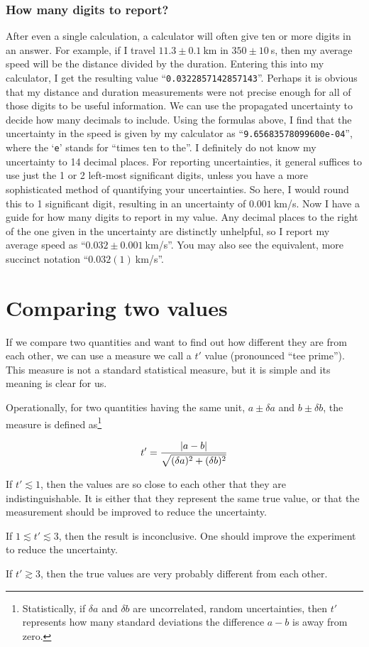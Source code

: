 \subsubsection{How many digits to report?}

After even a single calculation, a calculator will often give ten or more digits in an answer.
For example, if I travel $11.3 \pm 0.1\:$km in $350 \pm 10\:$s, then my average speed will be the distance divided by the duration. Entering this into my calculator, I get the resulting value ``\texttt{0.0322857142857143}''.
Perhaps it is obvious that my distance and duration measurements were not precise enough for all of those digits to be useful information.
We can use the propagated uncertainty to decide how many decimals to include.
Using the formulas above, I find that the uncertainty in the speed is given by my calculator as ``\texttt{9.65683578099600e-04}'', where the `\texttt{e}' stands for ``times ten to the''.
I definitely do not know my uncertainty to 14 decimal places.
For reporting uncertainties, it general suffices to use just the 1 or 2 left-most significant digits, unless you have a more sophisticated method of quantifying your uncertainties.
So here, I would round this to 1 significant digit, resulting in an uncertainty of $0.001\:$km/s.
Now I have a guide for how many digits to report in my value.
Any decimal places to the right of the one given in the uncertainty are distinctly unhelpful, so I report my average speed as ``$0.032 \pm 0.001\:$km/s''.
You may also see the equivalent, more succinct notation ``$0.032(1)\:$km/s''.

\section{Comparing two values}\label{unc:sec:comparing}

If we compare two quantities and want to find out how different they are from each other, we can use a measure we call a $t'$ value (pronounced ``tee prime''). This measure is not a standard statistical measure, but it is simple and its meaning is clear for us.

Operationally, for two quantities having the same unit, $a \pm \delta a$ and $b \pm \delta b$, the measure is defined as\footnote{Statistically, if $\delta a$ and $\delta b$ are uncorrelated, random uncertainties, then $t'$ represents how many standard deviations the difference $a - b$ is away from zero.}

\begin{equation}
t' = \frac{\left\lvert a-b\right\rvert}{\sqrt{(\delta a)^2 + (\delta b)^2}}
\end{equation}

If $t' \lesssim 1$, then the values are so close to each other that they are indistinguishable. It is either that they represent the same true value, or that the measurement should be improved to reduce the uncertainty.

If $1 \lesssim t' \lesssim 3$, then the result is inconclusive. One should improve the experiment to reduce the uncertainty.

If $t' \gtrsim 3$, then the true values are very probably different from each other.